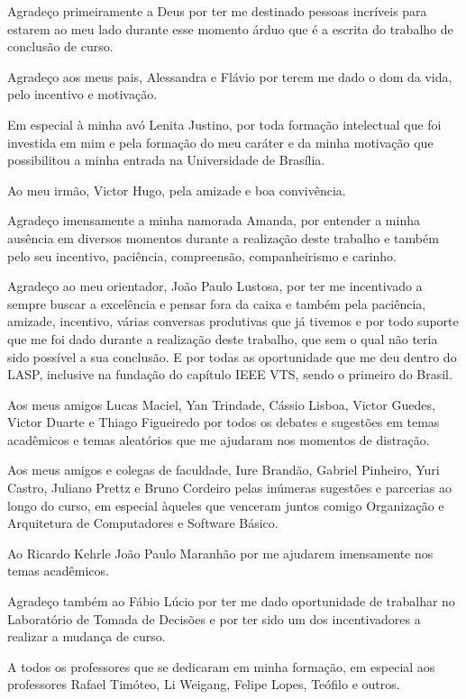 Agradeço primeiramente a Deus por ter me destinado pessoas incríveis para estarem ao meu lado 
durante esse momento árduo que é a escrita do trabalho de conclusão de curso. 

Agradeço aos meus pais, Alessandra e Flávio por terem me dado o dom da vida, pelo incentivo e motivação.

Em especial à minha avó Lenita Justino, por toda formação 
intelectual que foi investida em mim e pela formação do meu caráter e da minha motivação que possibilitou 
a minha entrada na Universidade de Brasília.

Ao meu irmão, Victor Hugo, pela amizade e boa convivência.

Agradeço imensamente a minha namorada Amanda, por entender a minha ausência em diversos momentos durante a realização deste trabalho
e também pelo seu incentivo, paciência, compreensão, companheirismo e carinho.

Agradeço ao meu orientador, João Paulo Lustosa, por ter me incentivado a sempre buscar a excelência e pensar fora da caixa e também
pela paciência, amizade, incentivo, várias conversas produtivas que já tivemos e por todo suporte que me foi dado durante a realização deste 
trabalho, que sem o qual não teria sido possível a sua conclusão. E por todas as oportunidade que me deu dentro do LASP, inclusive na fundação 
do capítulo IEEE VTS, sendo o primeiro do Brasil.

Aos meus amigos Lucas Maciel, Yan Trindade, Cássio Lisboa, Victor Guedes, Victor Duarte e Thiago Figueiredo por todos os debates e sugestões em temas acadêmicos 
e temas aleatórios que me ajudaram nos momentos de distração.

Aos meus amigos e colegas de faculdade, Iure Brandão, Gabriel Pinheiro, Yuri Castro, Juliano Prettz e 
Bruno Cordeiro pelas inúmeras sugestões e parcerias ao longo do curso, em especial àqueles que venceram juntos comigo Organização e Arquitetura
de Computadores e Software Básico.

Ao Ricardo Kehrle João Paulo Maranhão por me ajudarem imensamente nos temas acadêmicos. 

Agradeço também ao Fábio Lúcio por ter me dado oportunidade de trabalhar no Laboratório de Tomada de Decisões e por ter sido um
dos incentivadores a realizar a mudança de curso.

A todos os professores que se dedicaram em minha formação, em especial aos professores Rafael Timóteo, Li Weigang, Felipe Lopes, Teófilo e outros.

